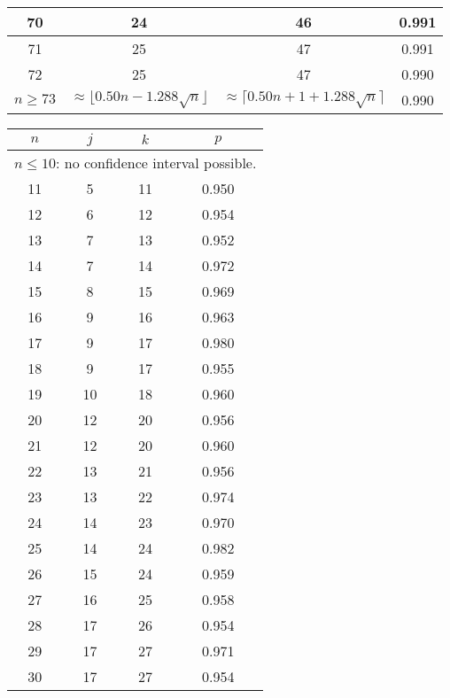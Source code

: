 \begin{table}
\begin{tabular}{|c|c|c|c|}
 70  & 24  & 46 & 0.991  \\ \hline
 71  & 25  & 47 & 0.991  \\ \hline
 72  & 25  & 47 & 0.990  \\ \hline
\hline $n \geq 73$ &
\multicolumn{1}{p{15mm}|}{$\approx \lfloor 0.50 n - 1.288 \sqrt{n}\rfloor$} &
\multicolumn{1}{p{15mm}|}{$\approx \lceil 0.50 n + 1 + 1.288 \sqrt{n}\rceil$} &
0.990 \\ \hline
\end{tabular}
 \hspace{2mm}
\end{table}


\begin{table}\center \scriptsize
\hspace{2mm}
 \begin{tabular}{|c|c|c|c|}
 \hline $n$ & $j$ & $k$ & $p$ \\ \hline \hline
\multicolumn{4}{|c|}{
$n \leq 10 $: no confidence interval possible.}\\ \hline
 11  & 5  & 11 & 0.950  \\ \hline
 12  & 6  & 12 & 0.954  \\ \hline
 13  & 7  & 13 & 0.952  \\ \hline
 14  & 7  & 14 & 0.972  \\ \hline
 15  & 8  & 15 & 0.969  \\ \hline
 16  & 9  & 16 & 0.963  \\ \hline
 17  & 9  & 17 & 0.980  \\ \hline
 18  & 9  & 17 & 0.955  \\ \hline
 19  & 10  & 18 & 0.960  \\ \hline
 20  & 12  & 20 & 0.956  \\ \hline
 21  & 12  & 20 & 0.960  \\ \hline
 22  & 13  & 21 & 0.956  \\ \hline
 23  & 13  & 22 & 0.974  \\ \hline
 24  & 14  & 23 & 0.970  \\ \hline
 25  & 14  & 24 & 0.982  \\ \hline
 26  & 15  & 24 & 0.959  \\ \hline
 27  & 16  & 25 & 0.958  \\ \hline
 28  & 17  & 26 & 0.954  \\ \hline
 29  & 17  & 27 & 0.971  \\ \hline
 30  & 17  & 27 & 0.954  \\ \hline

\end{tabular}
\end{table}
